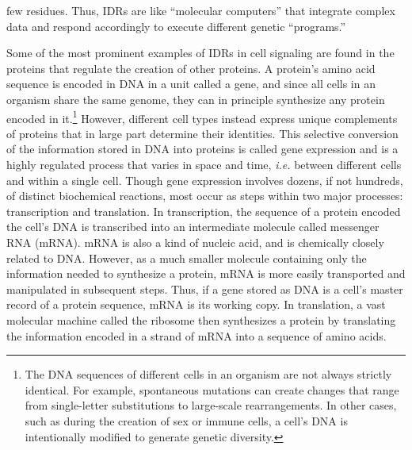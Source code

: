few residues. Thus, IDRs are like ``molecular computers'' that integrate complex data and respond accordingly to execute different genetic ``programs.''

Some of the most prominent examples of IDRs in cell signaling are found in the proteins that regulate the creation of other proteins. A protein's amino acid sequence is encoded in DNA in a unit called a gene, and since all cells in an organism share the same genome, they can in principle synthesize any protein encoded in it.\footnote{The DNA sequences of different cells in an organism are not always strictly identical. For example, spontaneous mutations can create changes that range from single-letter substitutions to large-scale rearrangements. In other cases, such as during the creation of sex or immune cells, a cell's DNA is intentionally modified to generate genetic diversity.} However, different cell types instead express unique complements of proteins that in large part determine their identities. This selective conversion of the information stored in DNA into proteins is called gene expression and is a highly regulated process that varies in space and time, \textit{i.e.} between different cells and within a single cell. Though gene expression involves dozens, if not hundreds, of distinct biochemical reactions, most occur as steps within two major processes: transcription and translation. In transcription, the sequence of a protein encoded the cell's DNA is transcribed into an intermediate molecule called messenger RNA (mRNA). mRNA is also a kind of nucleic acid, and is chemically closely related to DNA. However, as a much smaller molecule containing only the information needed to synthesize a protein, mRNA is more easily transported and manipulated in subsequent steps. Thus, if a gene stored as DNA is a cell's master record of a protein sequence, mRNA is its working copy. In translation, a vast molecular machine called the ribosome then synthesizes a protein by translating the information encoded in a strand of mRNA into a sequence of amino acids.

